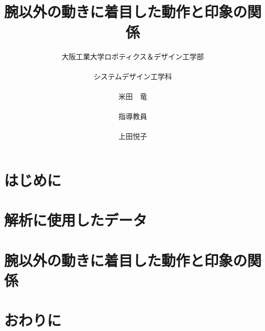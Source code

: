 \documentclass[titlepage,a4pape]{jsarticle}
\title{\vspace{-15mm}{\LARGE 2021年度　卒業論文}\\\vspace{25mm}
\huge
腕以外の動きに着目した動作と印象の関係
\vspace{20mm}\\}
\author{
\Large 大阪工業大学ロボティクス＆デザイン工学部\\\\
\vspace{5mm}\Large システムデザイン工学科\\
\vspace{5mm}
\vspace{0mm}\\
{\huge 米田　竜} \vspace{14.5mm}\\
\\\Large 指導教員\\\\\vspace{-4.0mm}
\vspace{0mm}\Large 上田悦子
}
\date{}
\begin{document}
\maketitle
\newpage


\newpage

\section{はじめに}


\clearpage
\section{解析に使用したデータ}


\clearpage
\section{腕以外の動きに着目した動作と印象の関係}


\section{おわりに}


\clearpage



\end{document}
